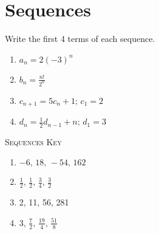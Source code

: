 \chapter{Sequences}

Write the first 4 terms of each sequence.
\begin{enumerate}
	\item $a_n = 2(-3)^n$
	\item $b_n = \frac{n!}{2^n}$
	\item $c_{n+1} = 5c_n + 1; \, c_1 = 2$
	\item $d_{n} = \frac{1}{2}d_{n-1} + n; \, d_1 = 3$
\end{enumerate}

\newpage

\textsc{Sequences Key}

\begin{enumerate}
	\item $-6, \, 18, \, -54, \, 162$
    \item $\frac{1}{2}, \, \frac{1}{2}, \, \frac{3}{4}, \, \frac{3}{2}$
    \item 2, 11, 56, 281
    \item $3, \, \frac{7}{2}, \, \frac{19}{4}, \, \frac{51}{8}$
\end{enumerate}